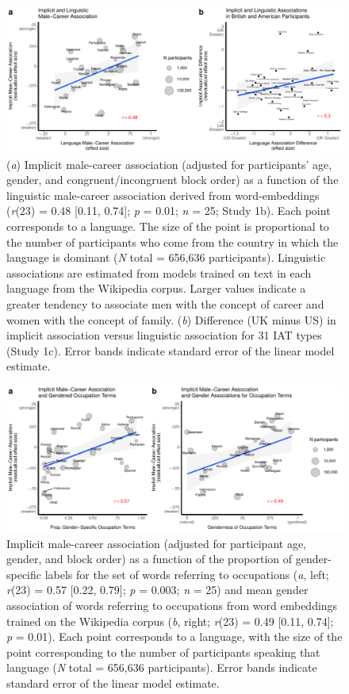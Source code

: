 \documentclass[9pt,twocolumn]{pnas-new}
\begin{document}
\begin{figure}
\centering
\includegraphics{../figs/fig2.pdf}
\caption{ ({\it a})  Implicit male-career association (adjusted for participants' age, gender, and congruent/incongruent block order) as a function of the linguistic male-career association derived from word-embeddings (\emph{r}(23) = 0.48 {[}0.11, 0.74{]}; \emph{p} = 0.01; \emph{n} = 25; Study 1b). Each point corresponds to a language. The size of the point is proportional to the number of participants who come from the country in which the language is dominant ({\it N} total = 656,636 participants). Linguistic associations are estimated from models trained on text in each language from the Wikipedia corpus. Larger values indicate a greater tendency to associate men with the concept of career and women with the concept of family. ({\it b}) Difference (UK minus US) in implicit association versus linguistic association for 31 IAT types (Study 1c). Error bands indicate standard error of the linear model
estimate.}
\end{figure}

\begin{figure}
\centering
\includegraphics{../figs/fig3.pdf}
\caption{ Implicit male-career association (adjusted for participant age,
gender, and block order) as a function of the proportion of gender-specific labels for the set of words referring to occupations ({\it a}, left; \emph{r}(23) = 0.57 {[}0.22, 0.79{]}; \emph{p} = 0.003; \emph{n} = 25) and  mean gender association of words
referring to occupations from word embeddings trained on the Wikipedia corpus ({\it b}, right; \emph{r}(23) = 0.49 {[}0.11, 0.74{]}; \emph{p} = 0.01). Each point corresponds to a language, with the size of the point corresponding to the number of participants
speaking that language ({\it N} total = 656,636 participants). Error bands indicate standard error of the
linear model estimate.}
\end{figure}


\newpage
\end{document}
